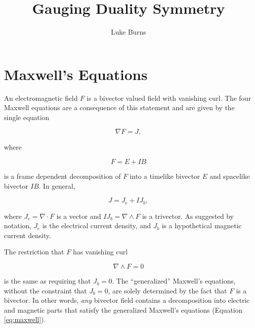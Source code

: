 \documentclass{article}
\title{Gauging Duality Symmetry}
\author{Luke Burns}
\begin{document}
  \maketitle


  \section{Maxwell's Equations}

  An electromagnetic field $F$ is a bivector valued field with vanishing curl. The four Maxwell equations are a consequence of this statement and are given by the single equation\cite{gap}

  \begin{equation}
    \nabla F = J,\label{eq:maxwell}
  \end{equation}

  where 

  \begin{equation}
    F = E + I B
  \end{equation}

  is a frame dependent decomposition of $F$ into a timelike bivector $E$ and spacelike bivector $IB$. In general, 

  \begin{equation}
    J = J_e + I J_b,\label{eq:current}
  \end{equation}

  where $J_e = \nabla \cdot F$ is a vector and $I J_b = \nabla \wedge F$ is a trivector. As suggested by notation, $J_e$ is the electrical current density, and $J_b$ is a hypothetical magnetic current density.

  The restriction that $F$ has vanishing curl

  \begin{equation}
    \nabla \wedge F = 0\label{eq:constraint}
  \end{equation}

  is the same as requiring that $J_b = 0$. The ``generalized'' Maxwell's equations, without the constraint that $J_b=0$, are solely determined by the fact that $F$ is a bivector. In other words, \emph{any} bivector field contains a decomposition into electric and magnetic parts that satisfy the generalized Maxwell's equations (Equation \ref{eq:maxwell}).
\end{document}
